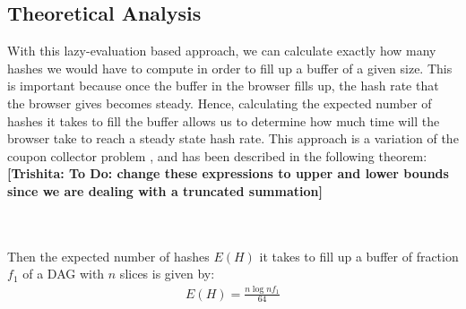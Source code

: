 \documentclass[runningheads]{llncs}
\newcommand{\trishita}[1]{{\color{magenta}\bfseries[Trishita: #1]}}
\begin{document}
\subsection{Theoretical Analysis}
With this lazy-evaluation based approach, we can calculate exactly how many hashes we would have to compute in order to fill up a buffer of a given size. This is important because once the buffer in the browser fills up, the hash rate that the browser gives becomes steady. Hence, calculating the expected number of hashes it takes to fill the buffer allows us to determine how much time will the browser take to reach a steady state hash rate. This approach is a variation of the coupon collector problem \cite{couponCollector}, and has been described in the following theorem:
\trishita{To Do: change these expressions to upper and lower bounds since we are dealing with a truncated summation}
\begin{theorem}
\label{expectedHashes}\\
 \\
Then the expected number of hashes $E(H)$ it takes to fill up a buffer of fraction $f_1$ of a DAG with $n$ slices is given by:
\begin{gather}
E(H) = \frac{n\log{nf_1}}{64}
\end{gather}
\end{theorem}
\end{document}
